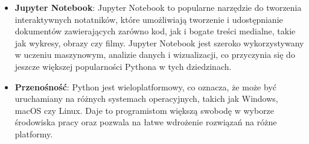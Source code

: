 \begin{itemize}
\item \textbf{Jupyter Notebook}: Jupyter Notebook to popularne narzędzie do tworzenia interaktywnych notatników, które umożliwiają tworzenie i udostępnianie dokumentów zawierających zarówno kod, jak i bogate treści medialne, takie jak wykresy, obrazy czy filmy. Jupyter Notebook jest szeroko wykorzystywany w uczeniu maszynowym, analizie danych i wizualizacji, co przyczynia się do jeszcze większej popularności Pythona w tych dziedzinach.

\item \textbf{Przenośność}: Python jest wieloplatformowy, co oznacza, że może być uruchamiany na różnych systemach operacyjnych, takich jak Windows, macOS czy Linux. Daje to programistom większą swobodę w wyborze środowiska pracy oraz pozwala na łatwe wdrożenie rozwiązań na różne platformy.

\end{itemize}